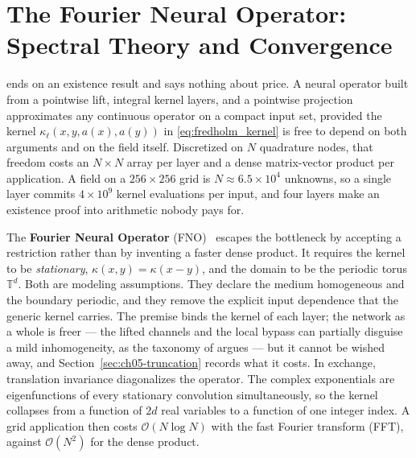 
\chapter{The Fourier Neural Operator: Spectral Theory and Convergence}
\label{ch:part1-the-fourier-neural-operator-spectral-theor}
\label{sec:fno}

 ends on an
existence result and says nothing about price. A neural operator built from a
pointwise lift, integral kernel layers, and a pointwise projection approximates
any continuous operator on a compact input set, provided the kernel
$\kappa_\ell(x,y,a(x),a(y))$ in \eqref{eq:fredholm_kernel} is free to depend on
both arguments and on the field itself. Discretized on $N$ quadrature nodes,
that freedom costs an $N \times N$ array per layer and a dense matrix-vector
product per application. A field on a $256 \times 256$ grid is
$N \approx 6.5 \times 10^4$ unknowns, so a single layer commits $4 \times 10^9$
kernel evaluations per input, and four layers make an existence proof into
arithmetic nobody pays for.

The \textbf{Fourier Neural Operator} (FNO)~\cite{li2021fourier} escapes the
bottleneck by accepting a restriction rather than by inventing a faster dense
product. It requires the kernel to be \emph{stationary},
$\kappa(x,y)=\kappa(x-y)$, and the domain to be the periodic torus
$\mathbb{T}^d$. Both are modeling assumptions. They declare the medium
homogeneous and the boundary periodic, and they remove
the explicit input dependence that the generic kernel carries. The premise binds
the kernel of each layer; the network as a whole is freer --- the lifted
channels and the local bypass can partially disguise a mild inhomogeneity, as
the taxonomy of
 argues --- but it
cannot be wished away, and Section~\ref{sec:ch05-truncation} records what it
costs. In exchange,
translation invariance diagonalizes the operator. The complex exponentials are
eigenfunctions of every stationary convolution simultaneously, so the kernel
collapses from a function of $2d$ real variables to a function of one integer
index. A grid application then costs $\mathcal{O}(N \log N)$ with the fast
Fourier transform (FFT), against $\mathcal{O}(N^2)$ for the dense product.

